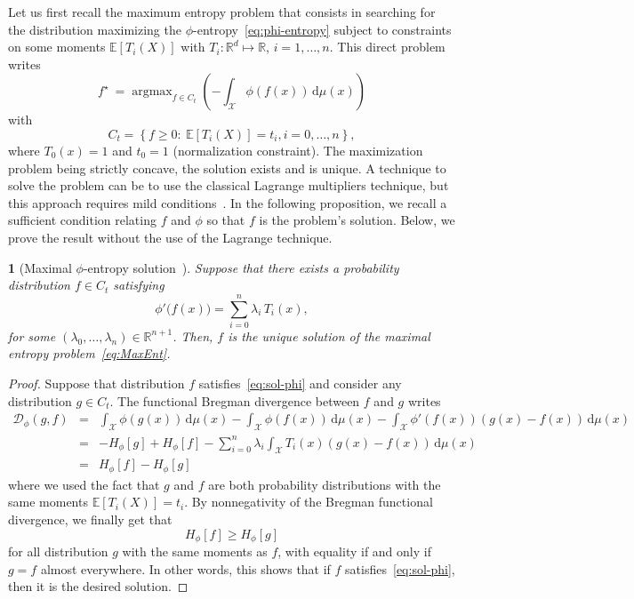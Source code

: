 \documentclass[english,sort&compress]{elsarticle}
\theoremstyle{definition}
\theoremstyle{plain}
\newtheorem{prop}{\protect\propositionname}
\theoremstyle{plain}
\providecommand{\propositionname}{Proposition}
\def\dmu{\mathrm{d}\mu}
\def\fD{\mathcal{D}}
\def\Rset{\mathbb{R}}
\def\X{\mathcal{X}}
\DeclareMathOperator*{\argmax}{\operatorname{argmax}}
\newcommand{\Esp}[1]{\mathbb{E}\left[ #1 \right]}
\begin{document}
Let us  first recall the maximum  entropy problem that consists  in searching for
the distribution maximizing the $\phi$-entropy~\eqref{eq:phi-entropy} subject to
constraints on  some moments $\Esp{T_i(X)}$  with $T_i: \Rset^d  \mapsto \Rset$,
$i=1,\ldots,n$. This direct problem writes
%
\begin{equation}\label{eq:MaxEnt}
\displaystyle f^\star \: = \argmax_{f \in C_t} \left( - \int_\X \phi(f(x))
\, \dmu(x) \right)
\end{equation}
%
with
%
\begin{equation}\label{eq:Ct}
C_t = \left\{ f \ge 0: \: \Esp{T_i(X)} = t_i, i=0,\ldots,n\right\},
\end{equation}
%
where $T_0(x) = 1$ and $t_0 = 1$ (normalization constraint). The maximization
problem being strictly concave, the solution exists and is unique. A technique
to solve the problem can be to use the classical Lagrange multipliers technique,
but this approach requires mild conditions~\cite{KesKap89, BorLew91:03,
 BorLew93, BenBor92, TebVaj93, Gir97}. In the following proposition, we recall a sufficient condition relating $f$ and $\phi$ so that $f$ is the problem's solution. Below, we prove the result without the use of the Lagrange technique.


\begin{prop}[Maximal                                               $\phi$-entropy
    solution~\cite{KesKap89}]
  \label{prop:sol-phi}  Suppose  that  there  exists  a
  probability distribution $f \in C_t$ satisfying
  \begin{equation}\label{eq:sol-phi}
    \phi'\big(f(x)\big) = \sum_{i=0}^n \lambda_i \, T_i(x),
  \end{equation}
  for  some $(\lambda_0,\ldots,\lambda_n)  \in \Rset^{n+1}$.   Then, $f$  is the
  unique solution of the maximal entropy problem~\eqref{eq:MaxEnt}.
\end{prop}
%
\begin{proof}  Suppose that  distribution  $f$ satisfies~\eqref{eq:sol-phi}  and
  consider  any distribution  $g  \in C_t$.  The  functional Bregman  divergence
  between $f$ and $g$ writes
  \begin{eqnarray*}
  \fD_\phi(g,f) & = & \int_\X \phi(g(x)) \, \dmu(x) - \int_\X \phi(f(x)) \, \dmu(x) -
  \int_\X \phi'(f(x)) \left( g(x) - f(x) \right) \, \dmu(x)
  \\[2mm]
  & = & - H_\phi[g] + H_\phi[f] - \sum_{i=0}^n \lambda_i \int_\X T_i(x) 
\left( g(x) - f(x)  \right) \, \dmu(x) \\[2mm]
  & = & H_\phi[f] - H_\phi[g]
  \end{eqnarray*}
  where we  used the fact  that $g$ and  $f$ are both  probability distributions
  with the same  moments $\Esp{T_i(X)} = t_i$.  By  nonnegativity of the Bregman
  functional divergence, we finally get that
  \[
  H_\phi[f] \ge H_\phi[g]
  \]
  for all distribution $g$ with the  same moments as $f$, with equality if and
  only if  $g = f$ almost  everywhere.  In other  words, this shows that  if $f$
  satisfies~\eqref{eq:sol-phi}, then it is the desired solution.
\end{proof}
\end{document}
